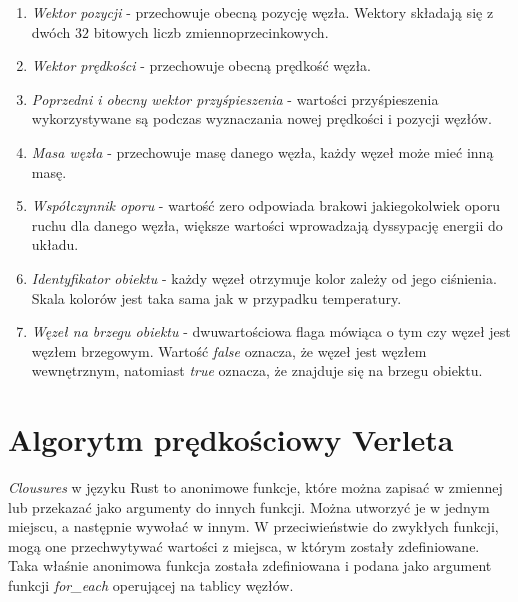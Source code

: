 \documentclass[12pt, letterpaper]{report}
\begin{document}
    \begin{enumerate}
        \item \emph{Wektor pozycji} - przechowuje obecną pozycję węzła. Wektory składają się z dwóch $32$ bitowych 
        liczb zmiennoprzecinkowych.

        \item \emph{Wektor prędkości} - przechowuje obecną prędkość węzła.

        \item \emph{Poprzedni i obecny wektor przyśpieszenia} - wartości przyśpieszenia wykorzystywane są
        podczas wyznaczania nowej prędkości i pozycji węzłów.

        \item \emph{Masa węzła} - przechowuje masę danego węzła, każdy węzeł może mieć inną masę.

        \item \emph{Współczynnik oporu} - wartość zero odpowiada brakowi jakiegokolwiek oporu ruchu dla danego
        węzła, większe wartości wprowadzają dyssypację energii do układu.

        \item \emph{Identyfikator obiektu} - każdy węzeł otrzymuje kolor zależy od jego ciśnienia. 
        Skala kolorów jest taka sama jak w przypadku temperatury.

        \item \emph{Węzeł na brzegu obiektu} - dwuwartościowa flaga mówiąca o tym czy węzeł jest węzłem brzegowym.
        Wartość \emph{false} oznacza, że węzeł jest węzłem wewnętrznym, 
        natomiast \emph{true} oznacza, że znajduje się na brzegu obiektu.
    \end{enumerate}

    \clearpage
    \section{Algorytm prędkościowy Verleta}
    

    \emph{Clousures} w języku Rust to anonimowe funkcje, które można zapisać w zmiennej lub przekazać 
    jako argumenty do innych funkcji. Można utworzyć je w jednym miejscu, a następnie wywołać w innym.
    W przeciwieństwie do zwykłych funkcji, mogą one przechwytywać wartości z miejsca, w 
    którym zostały zdefiniowane. Taka właśnie anonimowa funkcja została zdefiniowana i podana jako 
    argument funkcji \emph{for\_each} operującej na tablicy węzłów.
\end{document}

